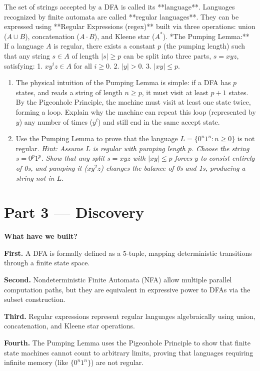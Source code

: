 \documentclass[12pt, a4paper]{book}
\begin{document}
\begin{explobox}
The set of strings accepted by a DFA is called its **language**.
Languages recognized by finite automata are called **regular languages**. They can be expressed using **Regular Expressions (regex)** built via three operations: union ($A \cup B$), concatenation ($A \cdot B$), and Kleene star ($A^*$).
\problem **The Pumping Lemma:** If a language $A$ is regular, there exists a constant $p$ (the pumping length) such that any string $s \in A$ of length $|s| \ge p$ can be split into three parts, $s = x y z$, satisfying:
1. $x y^i z \in A$ for all $i \ge 0$.
2. $|y| > 0$.
3. $|x y| \le p$.
\begin{enumerate}[label=(\alph*), leftmargin=*]
  \item The physical intuition of the Pumping Lemma is simple: if a DFA has $p$ states, and reads a string of length $n \ge p$, it must visit at least $p+1$ states.
        By the Pigeonhole Principle, the machine must visit at least one state twice, forming a loop.
        Explain why the machine can repeat this loop (represented by $y$) any number of times ($y^i$) and still end in the same accept state.
  \item Use the Pumping Lemma to prove that the language $L = \{0^n 1^n : n \ge 0\}$ is not regular.
        \textit{Hint: Assume $L$ is regular with pumping length $p$. Choose the string $s = 0^p 1^p$. Show that any split $s = xyz$ with $|xy| \le p$ forces $y$ to consist entirely of 0s, and pumping it ($xy^2z$) changes the balance of 0s and 1s, producing a string not in $L$.}
\end{enumerate}
\end{explobox}

\newpage

\section{Part 3 --- Discovery}

\begin{discoverybox}
\textbf{What have we built?}

\textbf{First.} A DFA is formally defined as a 5-tuple, mapping deterministic transitions through a finite state space.

\textbf{Second.} Nondeterministic Finite Automata (NFA) allow multiple parallel computation paths, but they are equivalent in expressive power to DFAs via the subset construction.

\textbf{Third.} Regular expressions represent regular languages algebraically using union, concatenation, and Kleene star operations.

\textbf{Fourth.} The Pumping Lemma uses the Pigeonhole Principle to show that finite state machines cannot count to arbitrary limits, proving that languages requiring infinite memory (like $\{0^n 1^n\}$) are not regular.
\end{discoverybox}
\end{document}

